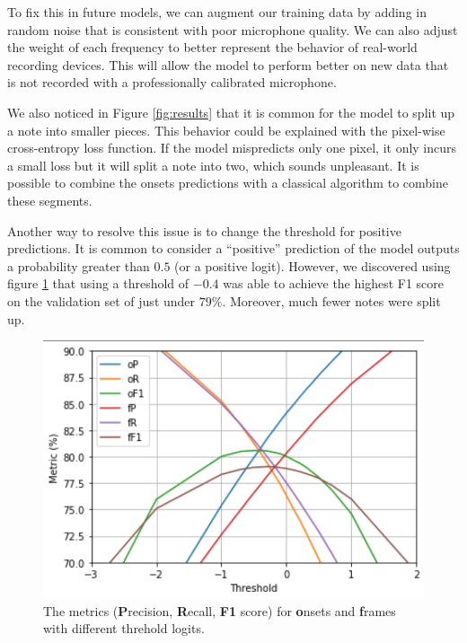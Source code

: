 \documentclass[a4paper,twocolumn,10pt]{article}
\begin{document}
To fix this in future models, we can augment our training data by adding in random noise that is consistent with poor microphone quality. We can also adjust the weight of each frequency to better represent the behavior of real-world recording devices. This will allow the model to perform better on new data that is not recorded with a professionally calibrated microphone.

We also noticed in Figure \ref{fig:results} that it is common for the model to split up a note into smaller pieces. This behavior could be explained with the pixel-wise cross-entropy loss function. If the model mispredicts only one pixel, it only incurs a small loss but it will split a note into two, which sounds unpleasant. It is possible to combine the onsets predictions with a classical algorithm to combine these segments.

Another way to resolve this issue is to change the threshold for positive predictions. It is common to consider a ``positive'' prediction of the model outputs a probability greater than \(0.5\) (or a positive logit). However, we discovered using figure \ref{fig:threshold} that using a threshold of \(-0.4\) was able to achieve the highest F1 score on the validation set of just under $79\%$. Moreover, much fewer notes were split up.

\begin{figure}[H]
  \centering
  \includegraphics[width=\linewidth]{figures/threshold.png}
  \caption{The metrics (\textbf{P}recision, \textbf{R}ecall, \textbf{F1} score) for \textbf{o}nsets and \textbf{f}rames with different threhold logits.}
  \label{fig:threshold}
\end{figure}
\end{document}
